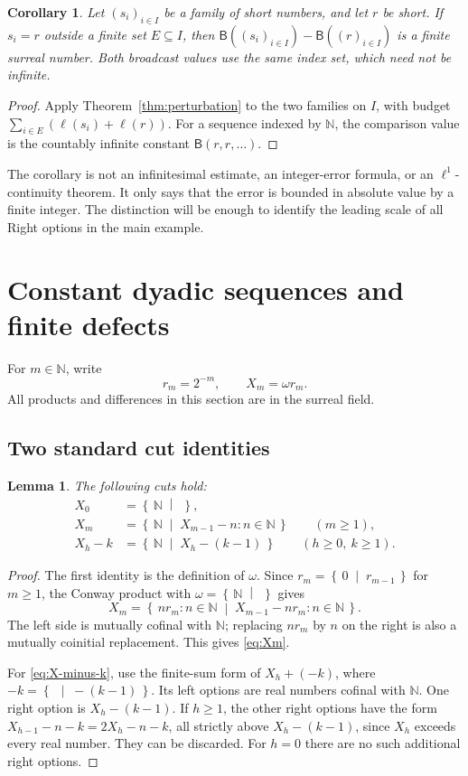 \documentclass[11pt,letterpaper]{article}
\newtheorem{lemma}[theorem]{Lemma}
\newtheorem{corollary}[theorem]{Corollary}
\theoremstyle{definition}
\theoremstyle{remark}
\newcommand{\NN}{\mathbb N}
\newcommand{\BB}{\mathsf B}
\newcommand{\len}{\ell}
\newcommand{\cut}[2]{\left\{\,#1\;\middle|\;#2\,\right\}}
\begin{document}
\begin{corollary}\label{cor:cofinite}
Let $(s_i)_{i\in I}$ be a family of short numbers, and let $r$ be short. If
$s_i=r$ outside a finite set $E\subseteq I$, then
$\BB((s_i)_{i\in I})-\BB((r)_{i\in I})$ is a finite surreal number.
Both broadcast values use the same index set, which need not be infinite.
\end{corollary}
\begin{proof}
Apply Theorem~\ref{thm:perturbation} to the two families on $I$, with budget
$\sum_{i\in E}(\len(s_i)+\len(r))$. For a sequence indexed by $\NN$, the
comparison value is the countably infinite constant $\BB(r,r,\ldots)$.
\end{proof}

The corollary is not an infinitesimal estimate, an integer-error formula, or an
$\ell^1$-continuity theorem. It only says that the error is bounded in absolute
value by a finite integer. The distinction will be enough to identify the
leading scale of all Right options in the main example.

\section{Constant dyadic sequences and finite defects}\label{sec:constants}

For $m\in\NN$, write
\begin{equation}\label{eq:r-X}
                         r_m=2^{-m},\qquad X_m=\omega r_m.
\end{equation}
All products and differences in this section are in the surreal field.

\subsection{Two standard cut identities}

\begin{lemma}\label{lem:X-cuts}
The following cuts hold:
\begin{align}
 X_0&=\cut{\NN}{},\label{eq:X0}\\
 X_m&=\cut{\NN}{X_{m-1}-n:n\in\NN}\qquad(m\geq1),\label{eq:Xm}\\
 X_h-k&=\cut{\NN}{X_h-(k-1)}\qquad(h\geq0,\ k\geq1).
 \label{eq:X-minus-k}
\end{align}
\end{lemma}
\begin{proof}
The first identity is the definition of $\omega$. Since
$r_m=\cut{0}{r_{m-1}}$ for $m\geq1$, the Conway product with
$\omega=\cut{\NN}{}$ gives
\[
 X_m=\cut{nr_m:n\in\NN}{X_{m-1}-nr_m:n\in\NN}.
\]
The left side is mutually cofinal with $\NN$; replacing $nr_m$ by $n$ on the
right is also a mutually coinitial replacement. This gives \eqref{eq:Xm}.

For \eqref{eq:X-minus-k}, use the finite-sum form of $X_h+(-k)$, where
$-k=\cut{} {-(k-1)}$. Its left options are real numbers cofinal with $\NN$.
One right option is $X_h-(k-1)$. If $h\geq1$, the other right options have the
form $X_{h-1}-n-k=2X_h-n-k$, all strictly above $X_h-(k-1)$, since $X_h$
exceeds every real number. They can be discarded. For $h=0$ there are no such
additional right options.
\end{proof}
\end{document}
